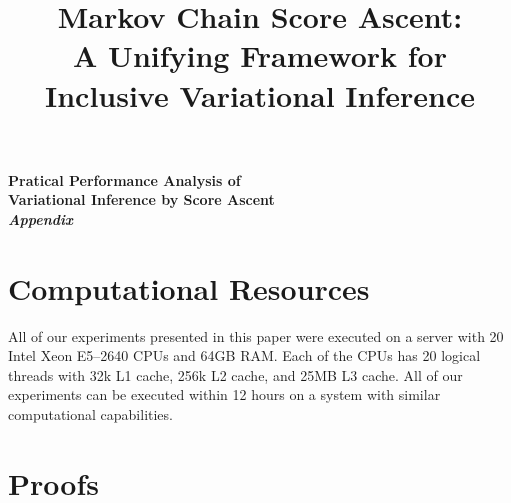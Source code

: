 \documentclass{article}
\title{Markov Chain Score Ascent: \\ A Unifying Framework for Inclusive Variational Inference }
\author{%
}
\begin{document}
\maketitle

\begin{abstract}
  
\end{abstract}









\newpage



\newpage
\appendix

\begin{center}
  \LARGE\bf
  Pratical Performance Analysis of \\
  Variational Inference by Score Ascent \\
  \textit{Appendix}
\end{center}

\section{Computational Resources}\label{section:resources}
 All of our experiments presented in this paper were executed on a server with 20 Intel Xeon E5--2640 CPUs and 64GB RAM.
Each of the CPUs has 20 logical threads with 32k L1 cache, 256k L2 cache, and 25MB L3 cache.
All of our experiments can be executed within 12 hours on a system with similar computational capabilities.


%


\section{Proofs}\label{section:proofs}
%
%
\printProofs


\end{document}
